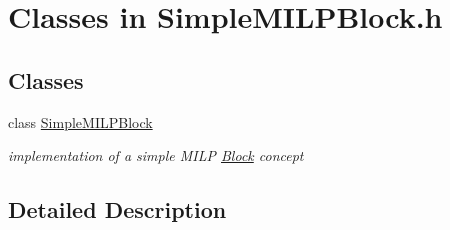 \hypertarget{group___simple_m_i_l_p_block___c_l_a_s_s_e_s}{}\section{Classes in Simple\+M\+I\+L\+P\+Block.\+h}
\label{group___simple_m_i_l_p_block___c_l_a_s_s_e_s}
\subsection*{Classes}
\begin{DoxyCompactItemize}
\item 
class \mbox{\hyperlink{class_s_m_spp__di__unipi__it_1_1_simple_m_i_l_p_block}{Simple\+M\+I\+L\+P\+Block}}
\begin{DoxyCompactList}\small\item\em implementation of a simple M\+I\+LP \mbox{\hyperlink{class_s_m_spp__di__unipi__it_1_1_block}{Block}} concept \end{DoxyCompactList}\end{DoxyCompactItemize}


\subsection{Detailed Description}
